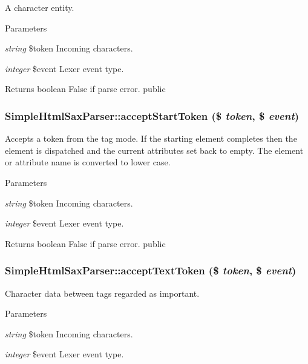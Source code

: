 \label{class_simple_html_sax_parser_a64e03cc7d6ee88bf887fc835271f7520}
A character entity. 
\begin{DoxyParams}{Parameters}
\item[{\em string}]\$token Incoming characters. \item[{\em integer}]\$event Lexer event type. \end{DoxyParams}
\begin{DoxyReturn}{Returns}
boolean False if parse error.  public 
\end{DoxyReturn}
\hypertarget{class_simple_html_sax_parser_a904741fe61cc7283c9f79d55ffcc4093}{
\subsubsection[{acceptStartToken}]{\setlength{\rightskip}{0pt plus 5cm}SimpleHtmlSaxParser::acceptStartToken (\$ {\em token}, \/  \$ {\em event})}}
\label{class_simple_html_sax_parser_a904741fe61cc7283c9f79d55ffcc4093}
Accepts a token from the tag mode. If the starting element completes then the element is dispatched and the current attributes set back to empty. The element or attribute name is converted to lower case. 
\begin{DoxyParams}{Parameters}
\item[{\em string}]\$token Incoming characters. \item[{\em integer}]\$event Lexer event type. \end{DoxyParams}
\begin{DoxyReturn}{Returns}
boolean False if parse error.  public 
\end{DoxyReturn}
\hypertarget{class_simple_html_sax_parser_a265f53b3f267aad0afd1ce50bd7633ad}{
\subsubsection[{acceptTextToken}]{\setlength{\rightskip}{0pt plus 5cm}SimpleHtmlSaxParser::acceptTextToken (\$ {\em token}, \/  \$ {\em event})}}
\label{class_simple_html_sax_parser_a265f53b3f267aad0afd1ce50bd7633ad}
Character data between tags regarded as important. 
\begin{DoxyParams}{Parameters}
\item[{\em string}]\$token Incoming characters. \item[{\em integer}]\$event Lexer event type. \end{DoxyParams}
